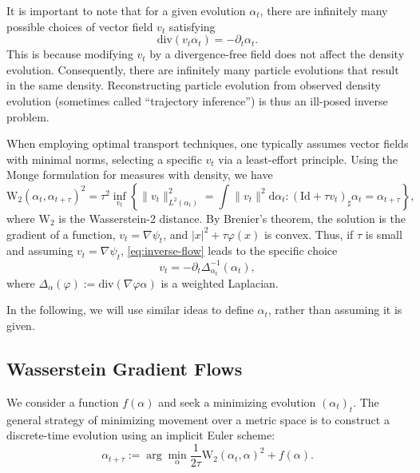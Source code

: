 It is important to note that for a given evolution $\alpha_t$, there are infinitely many possible choices of vector field $v_t$ satisfying
\begin{equation}
    \mathrm{div}(v_t \alpha_t) = -\partial_t \alpha_t. \label{eq:inverse-flow}
\end{equation}
This is because modifying $v_t$ by a divergence-free field does not affect the density evolution. Consequently, there are infinitely many particle evolutions that result in the same density. Reconstructing particle evolution from observed density evolution (sometimes called ``trajectory inference'') is thus an ill-posed inverse problem.

When employing optimal transport techniques, one typically assumes vector fields with minimal norms, selecting a specific $v_t$ via a least-effort principle. Using the Monge formulation for measures with density, we have
\begin{equation}
    \mathrm{W}_2(\alpha_t, \alpha_{t+\tau})^2 = \tau^2 \inf_{v_t} \left\{ \|v_t\|_{L^2(\alpha_t)}^2 = \int \|v_t\|^2 \mathrm{d} \alpha_t : (\mathrm{Id} + \tau v_t)_\sharp \alpha_t = \alpha_{t+\tau} \right\}, \label{eq:monge-field}
\end{equation}
where $\mathrm{W}_2$ is the Wasserstein-2 distance. By Brenier's theorem, the solution is the gradient of a function, $v_t = \nabla \psi_t$, and $|x|^2 + \tau \varphi(x)$ is convex. Thus, if $\tau$ is small and assuming $v_t = \nabla \psi_t$, \eqref{eq:inverse-flow} leads to the specific choice
\begin{equation}
    v_t = -\partial_t \Delta_{\alpha_t}^{-1}(\alpha_t),
\end{equation}
where $\Delta_\alpha(\varphi) := \mathrm{div}(\nabla \varphi \alpha)$ is a weighted Laplacian. 

In the following, we will use similar ideas to define $\alpha_t$, rather than assuming it is given.


\subsection{Wasserstein Gradient Flows}

We consider a function $f(\alpha)$ and seek a minimizing evolution $(\alpha_t)_t$. The general strategy of minimizing movement over a metric space is to construct a discrete-time evolution using an implicit Euler scheme:
\begin{equation}
    \alpha_{t+\tau} := \arg\min_\alpha \frac{1}{2 \tau} \mathrm{W}_2(\alpha_t, \alpha)^2 + f(\alpha). \label{eq:jko-discr}
\end{equation}

